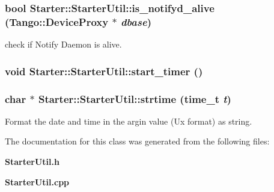 \subsubsection{\setlength{\rightskip}{0pt plus 5cm}bool Starter::Starter\-Util::is\_\-notifyd\_\-alive (Tango::Device\-Proxy $\ast$ {\em dbase})}\label{classStarter_1_1StarterUtil_z8_8}


check if Notify Daemon is alive.

\subsubsection{\setlength{\rightskip}{0pt plus 5cm}void Starter::Starter\-Util::start\_\-timer ()}\label{classStarter_1_1StarterUtil_z8_9}


\subsubsection{\setlength{\rightskip}{0pt plus 5cm}char $\ast$ Starter::Starter\-Util::strtime (time\_\-t {\em t})}\label{classStarter_1_1StarterUtil_z8_5}


Format the date and time in the argin value (Ux format) as string.



The documentation for this class was generated from the following files:\begin{CompactItemize}
\item 
{\bf Starter\-Util.h}\item 
{\bf Starter\-Util.cpp}\end{CompactItemize}

